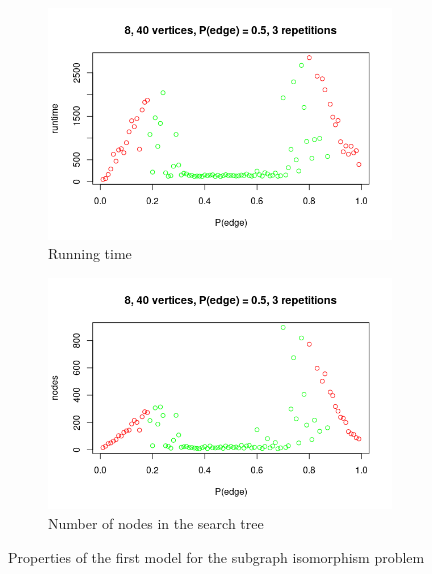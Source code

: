 \documentclass{article}
\begin{document}
\begin{figure}
  \begin{subfigure}{.5\textwidth}
    \includegraphics[scale=0.5]{subgraph_runtime.png}
    \caption{Running time}
  \end{subfigure}
  \begin{subfigure}{.5\textwidth}
    \includegraphics[scale=0.5]{subgraph_nodes.png}
    \caption{Number of nodes in the search tree}
  \end{subfigure}
  \caption{Properties of the first model for the subgraph isomorphism problem}
  \label{fig:subgraph_properties}
\end{figure}
\end{document}
